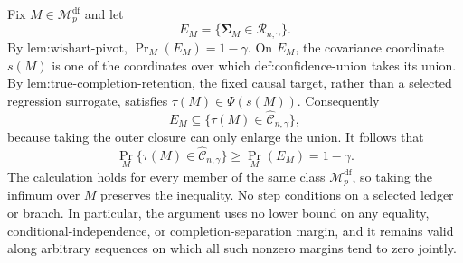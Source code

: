 Fix \(M\in\mathcal M_p^{\mathrm{df}}\) and let
\[
 E_M=\{\boldsymbol\Sigma_M\in\mathcal R_{n,\gamma}\}.
\]
By \(\text{lem:wishart-pivot}\), \(\Pr_M(E_M)=1-\gamma\).  On \(E_M\), the covariance coordinate \(s(M)\) is one of the coordinates over which \(\text{def:confidence-union}\) takes its union.  By \(\text{lem:true-completion-retention}\), the fixed causal target, rather than a selected regression surrogate, satisfies \(\tau(M)\in\Psi(s(M))\).  Consequently
\[
 E_M\subseteq
 \{\tau(M)\in\widehat{\mathcal C}_{n,\gamma}\},
\]
because taking the outer closure can only enlarge the union.  It follows that
\[
 \Pr_M\{\tau(M)\in\widehat{\mathcal C}_{n,\gamma}\}
 \ge \Pr_M(E_M)=1-\gamma.
\]
The calculation holds for every member of the same class \(\mathcal M_p^{\mathrm{df}}\), so taking the infimum over \(M\) preserves the inequality.  No step conditions on a selected ledger or branch.  In particular, the argument uses no lower bound on any equality, conditional-independence, or completion-separation margin, and it remains valid along arbitrary sequences on which all such nonzero margins tend to zero jointly.